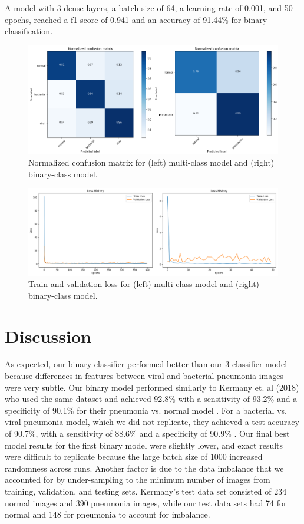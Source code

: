 \documentclass[conference]{IEEEtran}
\begin{document}
A model with 3 dense layers, a batch size of 64, a learning rate of 0.001, and 50 epochs, reached a f1 score of 0.941 and an accuracy of 91.44\% for binary classification. 
\begin{figure}[htbp]
\centerline{\includegraphics[scale=0.45]{combined-confusion.png}}
\caption{Normalized confusion matrix for (left) multi-class model and (right) binary-class model.}
\label{fig}
\end{figure}

\begin{figure}[htbp]
\centerline{\includegraphics[scale=0.45]{combined-loss.png}}
\caption{Train and validation loss for (left) multi-class model and (right) binary-class model.}
\label{fig}
\end{figure}

\section{Discussion}
As expected, our binary classifier performed better than our 3-classifier model because differences in features between viral and bacterial pneumonia images were very subtle. Our binary model performed similarly to Kermany et. al (2018) who used the same dataset and achieved 92.8\% with a sensitivity of 93.2\% and a specificity of 90.1\% for their pneumonia vs. normal model \cite{kermany2018identifying}. For a bacterial vs. viral pneumonia model, which we did not replicate, they achieved a test accuracy of 90.7\%, with a sensitivity of 88.6\% and a specificity of 90.9\% \cite{kermany2018identifying}. Our final best model results for the first binary model were slightly lower, and exact results were difficult to replicate because the large batch size of 1000 increased randomness across runs. Another factor is due to the data imbalance that we accounted for by under-sampling to the minimum number of images from training, validation, and testing sets. Kermany's test data set consisted of 234 normal images and 390 pneumonia images, while our test data sets had 74 for normal and 148 for pneumonia to account for imbalance.
\end{document}
